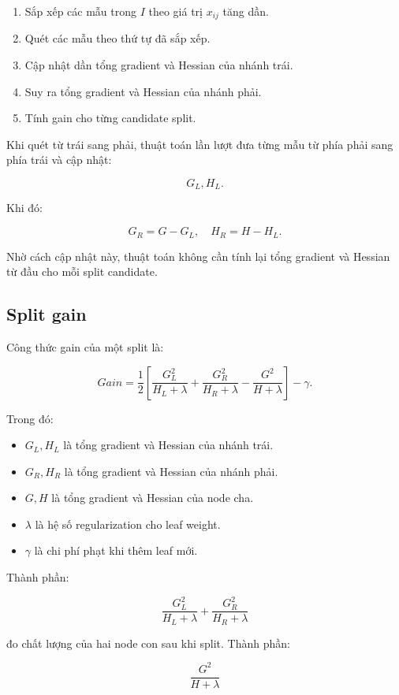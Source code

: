 \begin{enumerate}
    \item Sắp xếp các mẫu trong $I$ theo giá trị $x_{ij}$ tăng dần.
    \item Quét các mẫu theo thứ tự đã sắp xếp.
    \item Cập nhật dần tổng gradient và Hessian của nhánh trái.
    \item Suy ra tổng gradient và Hessian của nhánh phải.
    \item Tính gain cho từng candidate split.
\end{enumerate}

Khi quét từ trái sang phải, thuật toán lần lượt đưa từng mẫu từ phía phải sang phía trái và cập nhật:

\[
G_L, H_L.
\]

Khi đó:

\[
G_R = G - G_L,
\quad
H_R = H - H_L.
\]

Nhờ cách cập nhật này, thuật toán không cần tính lại tổng gradient và Hessian từ đầu cho mỗi split candidate.

\subsection{Split gain}

Công thức gain của một split là:

\[
Gain =
\frac{1}{2}
\left[
\frac{G_L^2}{H_L+\lambda}
+
\frac{G_R^2}{H_R+\lambda}
-
\frac{G^2}{H+\lambda}
\right]
-
\gamma.
\]

Trong đó:

\begin{itemize}
    \item $G_L, H_L$ là tổng gradient và Hessian của nhánh trái.
    \item $G_R, H_R$ là tổng gradient và Hessian của nhánh phải.
    \item $G, H$ là tổng gradient và Hessian của node cha.
    \item $\lambda$ là hệ số regularization cho leaf weight.
    \item $\gamma$ là chi phí phạt khi thêm leaf mới.
\end{itemize}

Thành phần:

\[
\frac{G_L^2}{H_L+\lambda}
+
\frac{G_R^2}{H_R+\lambda}
\]

đo chất lượng của hai node con sau khi split. Thành phần:

\[
\frac{G^2}{H+\lambda}
\]

